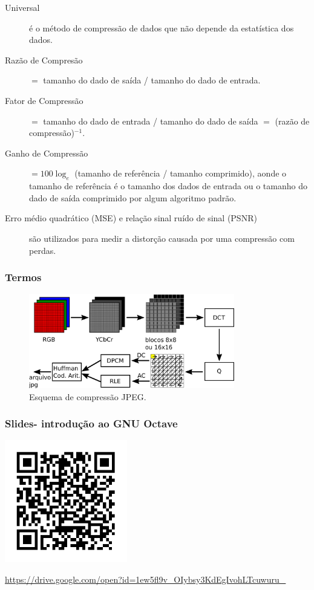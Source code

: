 \begin{frame}[allowframebreaks]
\begin{description}
  \item[Universal] é o método de compressão de dados que não depende da estatística dos dados.
  \item[Razão de Compresão] $=$ tamanho do dado de saída / tamanho do dado de entrada.
  \item[Fator de Compressão] $=$ tamanho do dado de entrada / tamanho do dado de saída $=$ (razão de compressão)$^{-1}$.
  \item[Ganho de Compressão] $= 100 \log_e $ (tamanho de referência / tamanho comprimido), aonde o tamanho de referência é o tamanho dos dados de entrada ou o tamanho do dado de saída comprimido por algum algoritmo padrão.
  \item[Erro médio quadrático (MSE) e relação sinal ruído de sinal (PSNR)] são utilizados para medir a distorção causada por uma compressão com perdas.
  \end{description}
\end{frame} 


\begin{frame}%
  \frametitle{Termos}
  \begin{figure}[h]
  \centering
  \includegraphics[width=0.8\textwidth]{images/jpegstd.pdf}
  \caption{Esquema de compressão JPEG.}\label{fig-jpegstd}
  \end{figure}
\end{frame} 

\begin{frame}%
  \frametitle{Slides- introdução ao GNU Octave}
  \centering
  \includegraphics[width=0.4\textwidth]{images/qrcode-octave-intro.pdf}

  \url{https://drive.google.com/open?id=1ew5fl9v_OIybsy3KdEgIvohLTcuwuru_}
\end{frame} 

